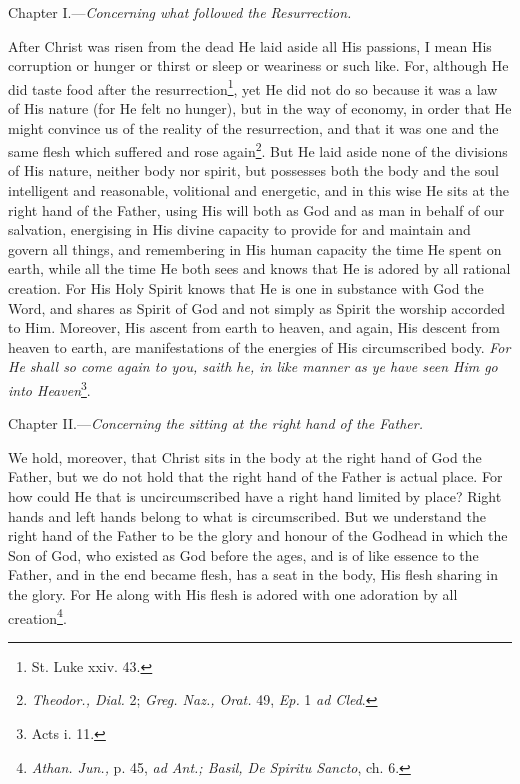 

Chapter I.—\emph{Concerning what followed the Resurrection.}

After Christ was risen from the dead He laid aside all His passions, I mean His corruption or hunger or thirst or sleep or weariness or such like. For, although He did taste food after the resurrection\footnote{St. Luke xxiv. 43.}, yet He did not do so because it was a law of His nature (for He felt no hunger), but in the way of economy, in order that He might convince us of the reality of the resurrection, and that it was one and the same flesh which suffered and rose again\footnote{\emph{Theodor., Dial. }2; \emph{Greg. Naz., Orat. }49, \emph{Ep. }1 \emph{ad Cled}.}. But He laid aside none of the divisions of His nature, neither body nor spirit, but possesses both the body and the soul intelligent and reasonable, volitional and energetic, and in this wise He sits at the right hand of the Father, using His will both as God and as man in behalf of our salvation, energising in His divine capacity to provide for and maintain and govern all things, and remembering in His human capacity the time He spent on earth, while all the time He both sees and knows that He is adored by all rational creation. For His Holy Spirit knows that He is one in substance with God the Word, and shares as Spirit of God and not simply as Spirit the worship accorded to Him. Moreover, His ascent from earth to heaven, and again, His descent from heaven to earth, are manifestations of the energies of His circumscribed body. \emph{For He shall so come again to you, saith he, in like manner as ye have seen Him go into Heaven}\footnote{Acts i. 11.}.


Chapter II.—\emph{Concerning the sitting at the right hand of the Father.}

We hold, moreover, that Christ sits in the body at the right hand of God the Father, but we do not hold that the right hand of the Father is actual place. For how could He that is uncircumscribed have a right hand limited by place? Right hands and left hands belong to what is circumscribed. But we understand the right hand of the Father to be the glory and honour of the Godhead in which the Son of God, who existed as God before the ages, and is of like essence to the Father, and in the end became flesh, has a seat in the body, His flesh sharing in the glory. For He along with His flesh is adored with one adoration by all creation\footnote{\emph{Athan. Jun.,} p. 45, \emph{ad Ant.; Basil, De Spiritu Sancto}, ch. 6.}.

